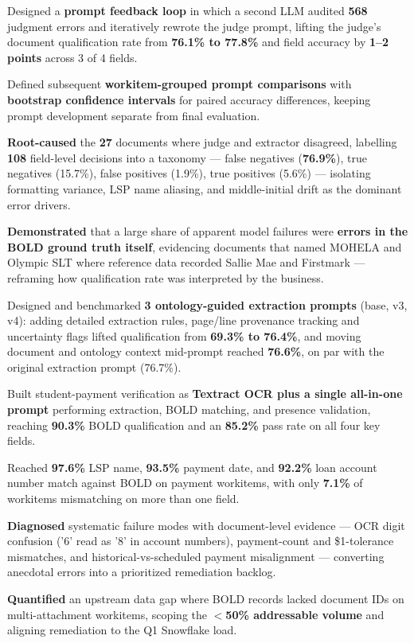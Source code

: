 \documentclass[letterpaper,11pt]{article}
\newcommand{\resumeItem}[1]{
  \item\small{
    {#1 \vspace{-2pt}}
  }
}
\begin{document}
        \resumeItem{Designed a \textbf{prompt feedback loop} in which a second LLM audited \textbf{568} judgment errors and iteratively rewrote the judge prompt, lifting the judge's document qualification rate from \textbf{76.1\% to 77.8\%} and field accuracy by \textbf{1--2 points} across 3 of 4 fields.}
        \resumeItem{Defined subsequent \textbf{workitem-grouped prompt comparisons} with \textbf{bootstrap confidence intervals} for paired accuracy differences, keeping prompt development separate from final evaluation.}
        \resumeItem{\textbf{Root-caused} the \textbf{27} documents where judge and extractor disagreed, labelling \textbf{108} field-level decisions into a taxonomy --- false negatives (\textbf{76.9\%}), true negatives (15.7\%), false positives (1.9\%), true positives (5.6\%) --- isolating formatting variance, LSP name aliasing, and middle-initial drift as the dominant error drivers.}
        \resumeItem{\textbf{Demonstrated} that a large share of apparent model failures were \textbf{errors in the BOLD ground truth itself}, evidencing documents that named MOHELA and Olympic SLT where reference data recorded Sallie Mae and Firstmark --- reframing how qualification rate was interpreted by the business.}
        \resumeItem{Designed and benchmarked \textbf{3 ontology-guided extraction prompts} (base, v3, v4): adding detailed extraction rules, page/line provenance tracking and uncertainty flags lifted qualification from \textbf{69.3\% to 76.4\%}, and moving document and ontology context mid-prompt reached \textbf{76.6\%}, on par with the original extraction prompt (76.7\%).}
        \resumeItem{Built student-payment verification as \textbf{Textract OCR plus a single all-in-one prompt} performing extraction, BOLD matching, and presence validation, reaching \textbf{90.3\%} BOLD qualification and an \textbf{85.2\%} pass rate on all four key fields.}
        \resumeItem{Reached \textbf{97.6\%} LSP name, \textbf{93.5\%} payment date, and \textbf{92.2\%} loan account number match against BOLD on payment workitems, with only \textbf{7.1\%} of workitems mismatching on more than one field.}
        \resumeItem{\textbf{Diagnosed} systematic failure modes with document-level evidence --- OCR digit confusion ('6' read as '8' in account numbers), payment-count and \$1-tolerance mismatches, and historical-vs-scheduled payment misalignment --- converting anecdotal errors into a prioritized remediation backlog.}
        \resumeItem{\textbf{Quantified} an upstream data gap where BOLD records lacked document IDs on multi-attachment workitems, scoping the \textbf{$<$50\% addressable volume} and aligning remediation to the Q1 Snowflake load.}
\end{document}

